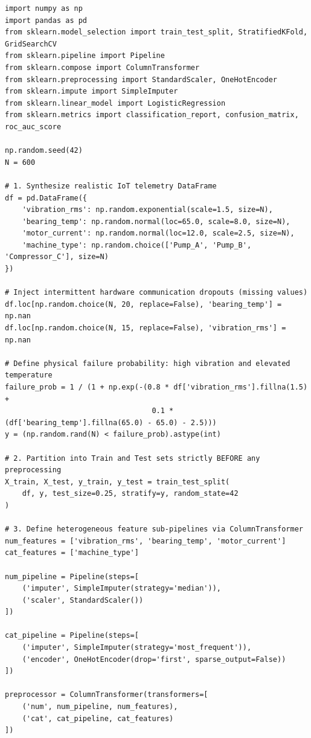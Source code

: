 \begin{lstlisting}[style=pythonstyle, caption={Leak-free machine learning pipeline with hyperparameter tuning.}, label={lst:production_pipeline}]
import numpy as np
import pandas as pd
from sklearn.model_selection import train_test_split, StratifiedKFold, GridSearchCV
from sklearn.pipeline import Pipeline
from sklearn.compose import ColumnTransformer
from sklearn.preprocessing import StandardScaler, OneHotEncoder
from sklearn.impute import SimpleImputer
from sklearn.linear_model import LogisticRegression
from sklearn.metrics import classification_report, confusion_matrix, roc_auc_score

np.random.seed(42)
N = 600

# 1. Synthesize realistic IoT telemetry DataFrame
df = pd.DataFrame({
    'vibration_rms': np.random.exponential(scale=1.5, size=N),
    'bearing_temp': np.random.normal(loc=65.0, scale=8.0, size=N),
    'motor_current': np.random.normal(loc=12.0, scale=2.5, size=N),
    'machine_type': np.random.choice(['Pump_A', 'Pump_B', 'Compressor_C'], size=N)
})

# Inject intermittent hardware communication dropouts (missing values)
df.loc[np.random.choice(N, 20, replace=False), 'bearing_temp'] = np.nan
df.loc[np.random.choice(N, 15, replace=False), 'vibration_rms'] = np.nan

# Define physical failure probability: high vibration and elevated temperature
failure_prob = 1 / (1 + np.exp(-(0.8 * df['vibration_rms'].fillna(1.5) + 
                                  0.1 * (df['bearing_temp'].fillna(65.0) - 65.0) - 2.5)))
y = (np.random.rand(N) < failure_prob).astype(int)

# 2. Partition into Train and Test sets strictly BEFORE any preprocessing
X_train, X_test, y_train, y_test = train_test_split(
    df, y, test_size=0.25, stratify=y, random_state=42
)

# 3. Define heterogeneous feature sub-pipelines via ColumnTransformer
num_features = ['vibration_rms', 'bearing_temp', 'motor_current']
cat_features = ['machine_type']

num_pipeline = Pipeline(steps=[
    ('imputer', SimpleImputer(strategy='median')),
    ('scaler', StandardScaler())
])

cat_pipeline = Pipeline(steps=[
    ('imputer', SimpleImputer(strategy='most_frequent')),
    ('encoder', OneHotEncoder(drop='first', sparse_output=False))
])

preprocessor = ColumnTransformer(transformers=[
    ('num', num_pipeline, num_features),
    ('cat', cat_pipeline, cat_features)
])


\end{lstlisting}
